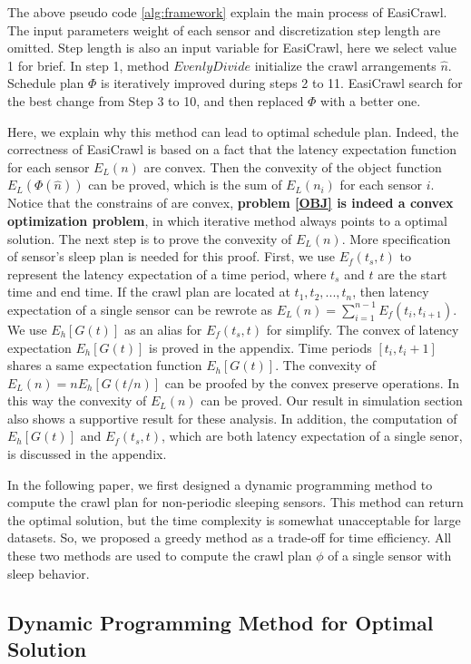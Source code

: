 \documentclass[conference]{IEEEtran}
\begin{document}
The above pseudo code \ref{alg:framework} explain the main process of EasiCrawl. 
The input parameters weight of each sensor and discretization step length are omitted.
Step length is also an input variable for EasiCrawl, here we select value 1 for brief.
In step 1, method $EvenlyDivide$ initialize the crawl arrangements $\hat{n}$. 
Schedule plan $\Phi$ is iteratively improved during steps 2 to 11. 
EasiCrawl search for the best change from Step 3 to 10, and then replaced $\Phi$ with a better one.

Here, we explain why this method can lead to optimal schedule plan.
Indeed, the correctness of EasiCrawl is based on a fact that the latency expectation function for each sensor $E_L(n)$ are convex. 
Then the convexity of the object function $E_L(\Phi(\hat{n}))$ can be proved, which is the sum of $E_L(n_i)$ for each sensor $i$.
Notice that the constrains of are convex, \textbf{problem \eqref{OBJ} is indeed a convex optimization problem}, in which iterative method always points to a optimal solution.
The next step is to prove the convexity of $E_L(n)$.
More specification of sensor's sleep plan is needed for this proof.
First, we use $E_f(t_s,t)$ to represent the latency expectation of a time period, where $t_s$ and $t$ are the start time and end time. If the crawl plan are located at $t_1,t_2,...,t_n$, then latency expectation of a single sensor can be rewrote as $E_L(n) = \sum_{i=1}^{n-1}E_f(t_{i},t_{i+1})$. We use $E_h[G(t)]$ as an alias for $E_f(t_s,t)$ for simplify.
The convex of latency expectation $E_h[G(t)]$ is proved in the appendix. 
Time periods $[t_i,t_i+1]$ shares a same expectation function $E_h[G(t)]$. 
The convexity of $E_L(n) = n E_h[G(t/n)]$ can be proofed by the convex preserve operations. 
In this way the convexity of $E_L(n)$ can be proved.
Our result in simulation section also shows a supportive result for these analysis.
In addition, the computation of $E_h[G(t)]$ and $E_f(t_s,t)$, which are both latency expectation of a single senor, is discussed in the appendix.

In the following paper, we first designed a dynamic programming method to compute the crawl plan for non-periodic sleeping sensors. 
This method can return the optimal solution, but the time complexity is somewhat unacceptable for large datasets.
So, we proposed a greedy method as a trade-off for time efficiency. 
All these two methods are used to compute the crawl plan $\phi$ of a single sensor with sleep behavior.

\subsection{Dynamic Programming Method for Optimal Solution}
\end{document}
